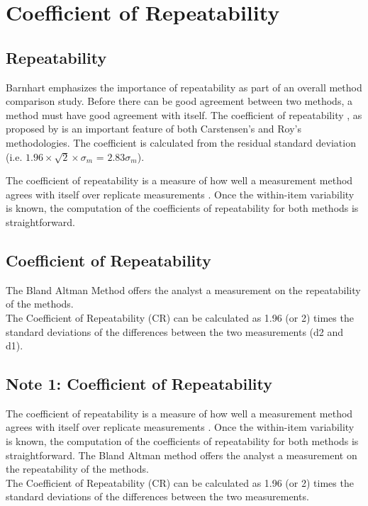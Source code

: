 \documentclass[Chap2cmain.tex]{subfiles}
\begin{document}
\newpage
\section{Coefficient of Repeatability}
\subsection{Repeatability}
Barnhart emphasizes the importance of repeatability as part of an overall method comparison study. Before there can be good agreement between two methods, a method must have good agreement with itself. The coefficient of repeatability , as proposed by \citet{BA99} is an important feature of both Carstensen's and Roy's methodologies. The coefficient is calculated from the residual standard deviation (i.e. $1.96 \times \sqrt{2} \times \sigma_m$ = $2.83 \sigma_m$).


The coefficient of repeatability is a measure of how well a
measurement method agrees with itself over replicate measurements
\citep{BA99}. Once the within-item variability is known, the
computation of the coefficients of repeatability for both methods
is straightforward.

\subsection{Coefficient of Repeatability}
The Bland Altman Method offers the analyst a measurement on the repeatability of the methods.\\ The Coefficient of Repeatability
(CR) can be calculated as 1.96 (or 2) times the standard deviations of the differences between the two measurements (d2 and
d1).
\subsection{Note 1: Coefficient of Repeatability}
The coefficient of repeatability is a measure of how well a
measurement method agrees with itself over replicate measurements
\citep{BA99}. Once the within-item variability is known, the
computation of the coefficients of repeatability for both methods
is straightforward.
\newpage
The Bland Altman method offers the analyst a measurement on the repeatability of the methods.\\ The Coefficient of Repeatability
(CR) can be calculated as 1.96 (or 2) times the standard deviations of the differences between the two measurements.
\end{document}
